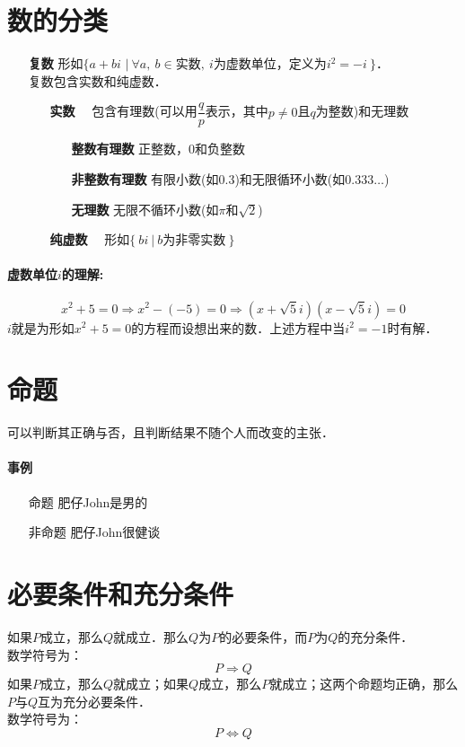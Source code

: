 \documentclass[12pt]{article}
\begin{document}
\begin{CJK}{UTF8}{gbsn}
\section{数的分类}
\begin{itemize}
\item[\textbf{复数}] 形如$\lbrace a+bi$ $|\ \forall a,\ b \in \text{实数},\ i\text{为虚数单位，定义为}i^2=-i\ \rbrace$．\\复数包含实数和纯虚数．
	\begin{itemize}
	\item[\textbf{实数}]　包含有理数(可以用$\dfrac{q}{p}$表示，其中$p\neq 0$且$q$为整数)和无理数
		\begin{itemize}
		\item[\textbf{整数有理数}] 正整数，$0$和负整数
		\item[\textbf{非整数有理数}] 有限小数(如$0.3$)和无限循环小数(如$0.333\dots$)
		\item[\textbf{无理数}] 无限不循环小数(如$\pi\text{和}\sqrt{2}$)
		\end{itemize}
	\item[\textbf{纯虚数}]　形如$\lbrace\ bi\ |\ b\text{为非零实数}\  \rbrace$
	\end{itemize}
\end{itemize}
\paragraph{虚数单位$i$的理解:}
$$x^2+5=0 \Rightarrow x^2-(-5)=0 \Rightarrow (x+\sqrt{5}i)(x-\sqrt{5}i)=0$$
$i$就是为形如$x^2+5=0$的方程而设想出来的数．上述方程中当$i^2=-1$时有解．

\section{命题}
可以判断其正确与否，且判断结果不随个人而改变的主张．\\
\paragraph{事例}
\begin{itemize}
\item[命题] 肥仔John是男的
\item[非命题] 肥仔John很健谈
\end{itemize}

\section{必要条件和充分条件}
如果$P$成立，那么$Q$就成立．那么$Q$为$P$的必要条件，而$P$为$Q$的充分条件．\\
数学符号为：
$$P \Rightarrow Q$$
如果$P$成立，那么$Q$就成立；如果$Q$成立，那么$P$就成立；这两个命题均正确，那么$P$与$Q$互为充分必要条件．\\
数学符号为：
$$P \Leftrightarrow Q$$


\end{CJK}
\end{document}

